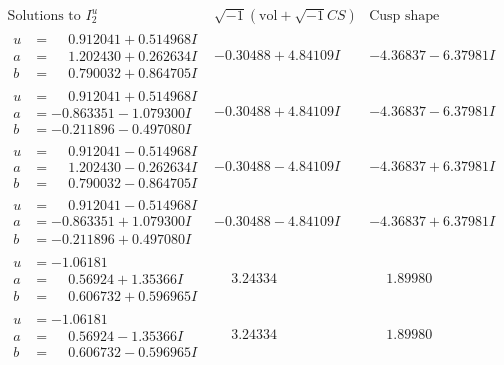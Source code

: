 \documentclass[1p]{elsarticle_modified}
\theoremstyle{definition}
\newcommand{\I}{\sqrt{-1}}
\begin{document}
$$\begin{array}{c|c|c}  
\text{Solutions to }I^u_{2}& \I (\text{vol} + \sqrt{-1}CS) & \text{Cusp shape}\\
 \hline 
\begin{aligned}
u &= \phantom{-}0.912041 + 0.514968 I \\
a &= \phantom{-}1.202430 + 0.262634 I \\
b &= \phantom{-}0.790032 + 0.864705 I\end{aligned}
 & -0.30488 + 4.84109 I & -4.36837 - 6.37981 I \\ \hline\begin{aligned}
u &= \phantom{-}0.912041 + 0.514968 I \\
a &= -0.863351 - 1.079300 I \\
b &= -0.211896 - 0.497080 I\end{aligned}
 & -0.30488 + 4.84109 I & -4.36837 - 6.37981 I \\ \hline\begin{aligned}
u &= \phantom{-}0.912041 - 0.514968 I \\
a &= \phantom{-}1.202430 - 0.262634 I \\
b &= \phantom{-}0.790032 - 0.864705 I\end{aligned}
 & -0.30488 - 4.84109 I & -4.36837 + 6.37981 I \\ \hline\begin{aligned}
u &= \phantom{-}0.912041 - 0.514968 I \\
a &= -0.863351 + 1.079300 I \\
b &= -0.211896 + 0.497080 I\end{aligned}
 & -0.30488 - 4.84109 I & -4.36837 + 6.37981 I \\ \hline\begin{aligned}
u &= -1.06181\phantom{ +0.000000I} \\
a &= \phantom{-}0.56924 + 1.35366 I \\
b &= \phantom{-}0.606732 + 0.596965 I\end{aligned}
 & \phantom{-}3.24334\phantom{ +0.000000I} & \phantom{-}1.89980\phantom{ +0.000000I} \\ \hline\begin{aligned}
u &= -1.06181\phantom{ +0.000000I} \\
a &= \phantom{-}0.56924 - 1.35366 I \\
b &= \phantom{-}0.606732 - 0.596965 I\end{aligned}
 & \phantom{-}3.24334\phantom{ +0.000000I} & \phantom{-}1.89980\phantom{ +0.000000I} \\ \hline\begin{aligned}

\end{aligned}
\end{array}$$
\end{document}
